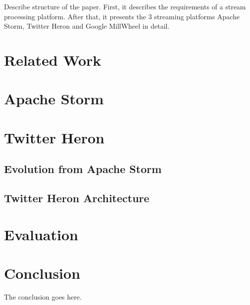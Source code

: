 \documentclass[conference]{IEEEtran}
\begin{document}
\cite{The8Requirements}
\cite{ElasticScalingStreamProcessing}
\cite{OnlyOneLook}
\cite{YARN}
\cite{ScalableDistributedStreamProcessing}

Describe structure of the paper.
First, it describes the requirements of a stream processing platform.
After that, it presents the 3 streaming platforms Apache Storm, Twitter Heron and Google MillWheel in detail.

\section{Related Work}

\cite{InfoQGameChanger}

\section{Apache Storm}

\cite{StormTwitter}

\section{Twitter Heron}

\subsection{Evolution from Apache Storm}

\subsection{Twitter Heron Architecture}



\section{Evaluation}

\cite{TwitterHeronBlog}

\cite{TwitterHeron}


\section{Conclusion}

The conclusion goes here.




\end{document}

